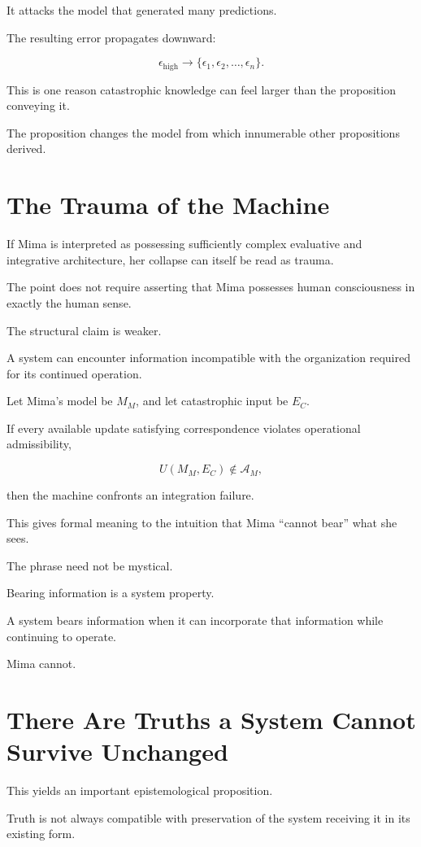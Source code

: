 \documentclass[11pt,oneside]{book}
\theoremstyle{definition}
\theoremstyle{remark}
\newcommand{\A}{\mathcal{A}}
\begin{document}
It attacks the model that generated many predictions.

The resulting error propagates downward:

\[
\epsilon_{\mathrm{high}}
\rightarrow
\{\epsilon_1,\epsilon_2,\ldots,\epsilon_n\}.
\]

This is one reason catastrophic knowledge can feel larger than the proposition conveying it.

The proposition changes the model from which innumerable other propositions derived.

\section{The Trauma of the Machine}

If Mima is interpreted as possessing sufficiently complex evaluative and integrative architecture, her collapse can itself be read as trauma.

The point does not require asserting that Mima possesses human consciousness in exactly the human sense.

The structural claim is weaker.

A system can encounter information incompatible with the organization required for its continued operation.

Let Mima's model be \(M_M\), and let catastrophic input be \(E_C\).

If every available update satisfying correspondence violates operational admissibility,

\[
U(M_M,E_C)\notin\A_M,
\]

then the machine confronts an integration failure.

This gives formal meaning to the intuition that Mima ``cannot bear'' what she sees.

The phrase need not be mystical.

Bearing information is a system property.

A system bears information when it can incorporate that information while continuing to operate.

Mima cannot.

\section{There Are Truths a System Cannot Survive Unchanged}

This yields an important epistemological proposition.

Truth is not always compatible with preservation of the system receiving it in its existing form.
\end{document}
